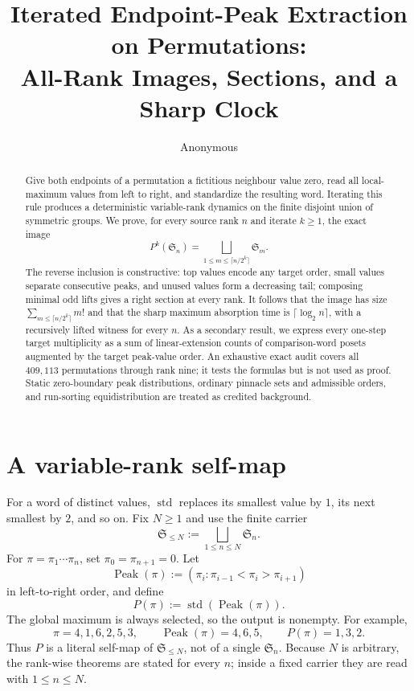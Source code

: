 \documentclass[a4paper,10pt]{amsart}
\title[Iterated endpoint-peak extraction]{Iterated Endpoint-Peak Extraction on Permutations:\\
All-Rank Images, Sections, and a Sharp Clock}
\author{Anonymous}
\date{}
\theoremstyle{definition}
\theoremstyle{remark}
\newcommand{\Sn}{\mathfrak S}
\newcommand{\std}{\operatorname{std}}
\newcommand{\Peak}{\operatorname{Peak}}
\begin{document}
\begin{abstract}
Give both endpoints of a permutation a fictitious neighbour value zero, read
all local-maximum values from left to right, and standardize the resulting
word.  Iterating this rule produces a deterministic variable-rank dynamics on
the finite disjoint union of symmetric groups.  We prove, for every source
rank $n$ and iterate $k\ge1$, the exact image
\[
 P^k(\Sn_n)=\bigsqcup_{1\le m\le\lceil n/2^k\rceil}\Sn_m.
\]
The reverse inclusion is constructive: top values encode any target order,
small values separate consecutive peaks, and unused values form a decreasing
tail; composing minimal odd lifts gives a right section at every rank.  It
follows that the image has size
$\sum_{m\le\lceil n/2^k\rceil}m!$ and that the sharp maximum absorption time
is $\lceil\log_2n\rceil$, with a recursively lifted witness for every $n$.
As a secondary result, we express every one-step target multiplicity as a sum
of linear-extension counts of comparison-word posets augmented by the target
peak-value order.  An exhaustive exact audit covers all $409{,}113$
permutations through rank nine; it tests the formulas but is not used as
proof.  Static zero-boundary peak distributions, ordinary pinnacle sets and
admissible orders, and run-sorting equidistribution are treated as credited
background.
\end{abstract}

\maketitle

\section{A variable-rank self-map}

For a word of distinct values, $\std$ replaces its smallest value by $1$, its
next smallest by $2$, and so on.  Fix $N\ge1$ and use the finite carrier
\[
              \Sn_{\le N}:=\bigsqcup_{1\le n\le N}\Sn_n.
\]
For $\pi=\pi_1\cdots\pi_n$, set $\pi_0=\pi_{n+1}=0$.  Let
\[
 \Peak(\pi):=(\pi_i:\pi_{i-1}<\pi_i>\pi_{i+1})
\]
in left-to-right order, and define
\begin{equation}\label{eq:P-def}
                         P(\pi):=\std(\Peak(\pi)).
\end{equation}
The global maximum is always selected, so the output is nonempty.  For
example,
\[
  \pi=4,1,6,2,5,3,
  \qquad \Peak(\pi)=4,6,5,
  \qquad P(\pi)=1,3,2.
\]
Thus $P$ is a literal self-map of $\Sn_{\le N}$, not of a single $\Sn_n$.
Because $N$ is arbitrary, the rank-wise theorems are stated for every $n$;
inside a fixed carrier they are read with $1\le n\le N$.
\end{document}
